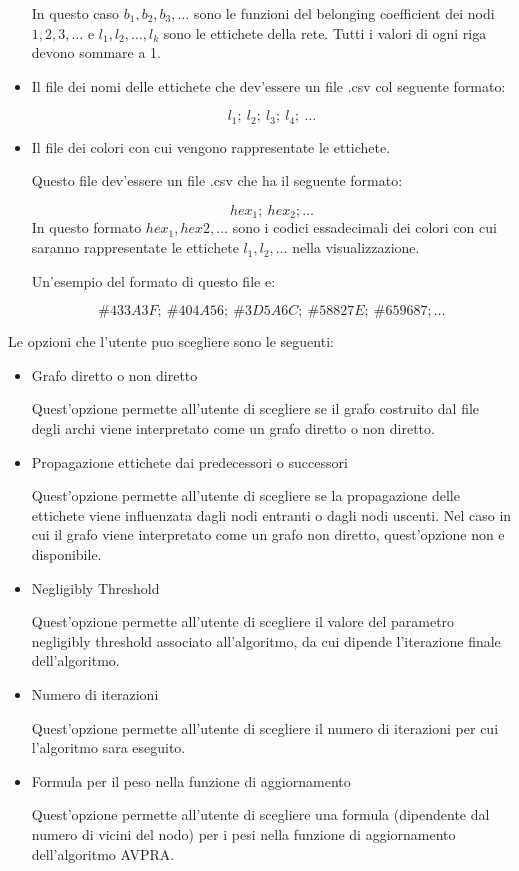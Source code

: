 \documentclass[a4paper,12pt]{report}
\begin{document}
\begin{itemize}
				In questo caso $b_1, b_2, b_3, \dots$ sono le funzioni del belonging coefficient dei nodi $1, 2, 3, \dots$ e $l_1, l_2, \dots, l_k$ sono le ettichete della rete. Tutti i valori di ogni riga devono sommare a 1. \par
				
				\item Il file dei nomi delle ettichete che dev'essere un file .csv col seguente formato: \par
				\begin{equation}
				l_1;\ l_2;\ l_3;\ l_4;\ \dots
				\end{equation}

				\item Il file dei colori con cui vengono rappresentate le ettichete. \par
				Questo file dev'essere un file .csv che ha il seguente formato: \par
				\begin{equation}
				hex_1;\ hex_2; \dots
				\end{equation}
				In questo formato $hex_1, hex2, \dots$ sono i codici essadecimali dei colori con cui saranno rappresentate le ettichete $l_1, l_2, \dots$ nella visualizzazione. \par
				Un'esempio del formato di questo file e: \par
				\begin{equation}
				\#433A3F;\ \#404A56;\ \#3D5A6C;\ \#58827E;\ \#659687; \dots
				\end{equation}
			\end{itemize}
			Le opzioni che l'utente puo scegliere sono le seguenti:
			\begin{itemize}
				\item Grafo diretto o non diretto \par
				Quest'opzione permette all'utente di scegliere se il grafo costruito dal file degli archi viene interpretato come un grafo diretto o non diretto.
				\item Propagazione ettichete dai predecessori o successori \par
				Quest'opzione permette all'utente di scegliere se la propagazione delle ettichete viene influenzata dagli nodi entranti o dagli nodi uscenti. Nel caso in cui il grafo viene interpretato come un grafo non diretto, quest'opzione non e disponibile.
				\item Negligibly Threshold \par
				Quest'opzione permette all'utente di scegliere il valore del parametro negligibly threshold associato all'algoritmo, da cui dipende l'iterazione finale dell'algoritmo.
				\item Numero di iterazioni \par
				Quest'opzione permette all'utente di scegliere il numero di iterazioni per cui l'algoritmo sara eseguito.
				\item Formula per il peso nella funzione di aggiornamento \par
				Quest'opzione permette all'utente di scegliere una formula (dipendente dal numero di vicini del nodo) per i pesi nella funzione di aggiornamento dell'algoritmo AVPRA.
			\end{itemize}
			
\end{document}
